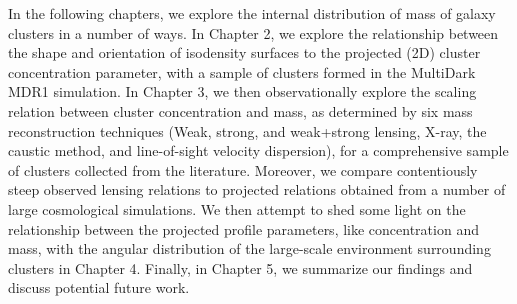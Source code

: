 In the following chapters, we explore the internal distribution of mass of galaxy clusters in a number of ways. In Chapter 2, we explore the relationship between the shape and orientation of isodensity surfaces to the projected (2D) cluster concentration parameter, with a sample of clusters formed in the MultiDark MDR1 simulation. In Chapter 3, we then observationally explore the scaling relation between cluster concentration and mass, as determined by six mass reconstruction techniques (Weak, strong, and weak+strong lensing, X-ray, the caustic method, and line-of-sight velocity dispersion), for a comprehensive sample of clusters collected from the literature. Moreover, we compare contentiously steep observed lensing relations to projected relations obtained from a number of large cosmological simulations. We then attempt to shed some light on the relationship between the projected profile parameters, like concentration and mass, with the angular distribution of the large-scale environment surrounding clusters in Chapter 4. Finally, in Chapter 5, we summarize our findings and discuss potential future work.
